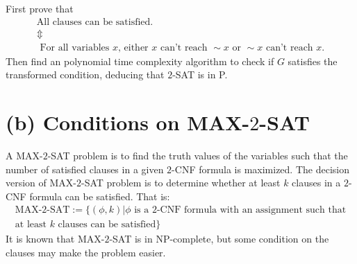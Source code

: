 First prove that
\begin{gather*}\text{All clauses can be satisfied.}\\
\Updownarrow\\
\text{ For all variables }x\text{, either }x\text{ can't reach }\sim x\text{ or }\sim x\text{ can't reach }x.
\end{gather*}
Then find an polynomial time complexity algorithm to check if $G$ satisfies the transformed condition, deducing that $2$-SAT is in P.

\iffalse
\section*{(b)}

A MAX-$2$-SAT problem is to find the truth values of the variables such that the number of satisfied clauses in a given $2$-CNF formula is maximized. The decision version of MAX-$2$-SAT problem is to determine whether at least $k$ clauses in a $2$-CNF formula can be satisfied. That is:
\begin{gather*}
\text{MAX-}2\text{-SAT}:=\{(\phi, k)|\phi\text{ is a }2\text{-CNF formula with an assignment such that}\\
\text{at least }k\text{ clauses can be satisfied}\}
\end{gather*}
Prove that MAX-$2$-SAT is in NP-complete.

\subsection*{Hint}

Take a look at what will happen to the following $10$ clauses:
$$x, y, z, w, \sim x\lor\sim y, \sim y\lor\sim z, \sim z\lor\sim x, x\lor\sim w, y\lor\sim w, z\lor\sim w$$
if $x\lor y\lor z$, and use this result to provide a reduction from a known NP-complete problem: MAX-$3$-SAT.
\fi

\section*{(b) Conditions on MAX-$2$-SAT}

A MAX-$2$-SAT problem is to find the truth values of the variables such that the number of satisfied clauses in a given $2$-CNF formula is maximized. The decision version of MAX-$2$-SAT problem is to determine whether at least $k$ clauses in a $2$-CNF formula can be satisfied. That is:
\begin{gather*}
\text{MAX-}2\text{-SAT}:=\{(\phi, k)|\phi\text{ is a }2\text{-CNF formula with an assignment such that}\\
\text{at least }k\text{ clauses can be satisfied}\}
\end{gather*}
It is known that MAX-$2$-SAT is in NP-complete, but some condition on the clauses may make the problem easier.


